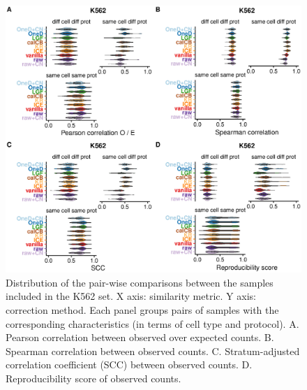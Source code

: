 \documentclass[12pt]{report}
\begin{document}
\begin{figure}
	\centerline{\includegraphics[width=\textwidth]{nar_figures/supp_figure_3.eps}}
    \caption{
    Distribution of the pair-wise comparisons between the samples included in
    the K562 set. X axis: similarity metric. Y axis: correction
    method. Each panel groups pairs of samples with the corresponding
    characteristics (in terms of cell type and protocol). A. Pearson correlation
    between observed over expected counts. B. Spearman correlation between
    observed counts. C. Stratum-adjusted correlation coefficient (SCC) between
    observed counts. D. Reproducibility score of observed counts.}
\end{figure}
\end{document}
